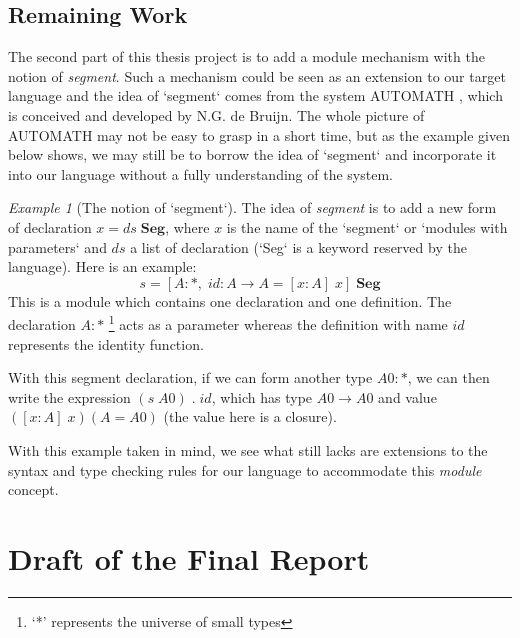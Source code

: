 \documentclass{article}
\theoremstyle{remark}
\newtheorem{example}{Example}[section]
\begin{document}
\subsection{Remaining Work}
The second part of this thesis project is to add a module mechanism with the notion of \emph{segment}. Such a mechanism could be seen as an extension to our target language and the idea of `segment` comes from the system AUTOMATH \cite{de1994survey}, which is conceived and developed by N.G. de Bruijn. The whole picture of AUTOMATH may not be easy to grasp in a short time, but as the example given below shows, we may still be to borrow the idea of `segment` and incorporate it into our language without a fully understanding of the system.
\begin{example}[The notion of `segment`]
  The idea of \emph{segment} is to add a new form of declaration $x = ds\; \textbf{Seg}$, where $x$ is the name of the `segment` or `modules with parameters` and $ds$ a list of declaration (`Seg` is a keyword reserved by the language). Here is an example:
  \[ s = [ A : *,\; id : A \to A = [x : A]\; x ]\; \textbf{Seg} \] 
  This is a module which contains one declaration and one definition. The declaration \( A : * \) \footnote{`*' represents the universe of small types} acts as a parameter whereas the definition with name $id$ represents the identity function.

  With this segment declaration, if we can form another type \( A0 : * \), we can then write the expression \( (s \; A0) \; . \; id \), which has type $A0 \to A0$ and value $([x : A]\; x) (A = A0)$ (the value here is a closure).
\end{example}

With this example taken in mind, we see what still lacks are extensions to the syntax and type checking rules for our language to accommodate this \emph{module} concept. 

\section{Draft of the Final Report}
\end{document}
